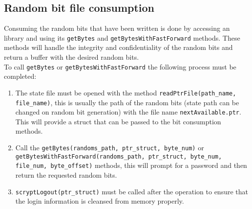 \documentclass{paper}
\begin{document}
			\subsection{Random bit file consumption}
				Consuming the random bits that have been written is done by accessing an library and using its \texttt{getBytes} and \texttt{getBytesWithFastForward} methods. These methods will handle the integrity and confidentiality of the random bits and return a buffer with the desired random bits.\\
				
				To call \texttt{getBytes} or \texttt{getBytesWithFastForward} the following process must be completed:
				\begin{enumerate}
					\setlength\itemsep{-0.3em}
					\item The state file must be opened with the method \texttt{readPtrFile(path\_name, file\_name)}, this is usually the path of the random bits (state path can be changed on random bit generation) with the file name \texttt{nextAvailable.ptr}. This will provide a struct that can be passed to the bit consumption methods.
					\item Call the \texttt{getBytes(randoms\_path, ptr\_struct, byte\_num)} or \texttt{getBytesWithFastForward(randoms\_path, ptr\_struct, byte\_num, file\_num, byte\_offset)} methods, this will prompt for a password and then return the requested random bits.
					\item \texttt{scryptLogout(ptr\_struct)} must be called after the operation to ensure that the login information is cleansed from memory properly.
				\end{enumerate}
				
\end{document}
